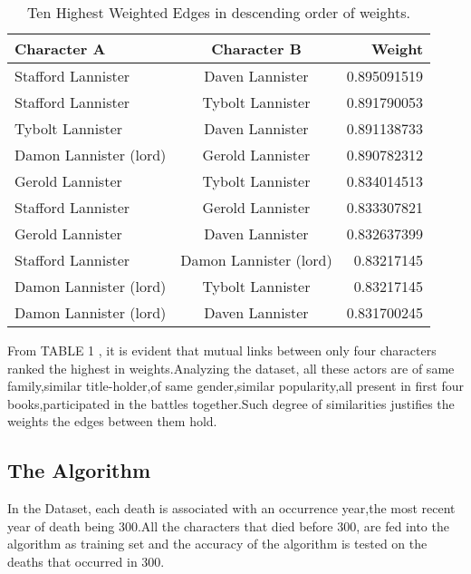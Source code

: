 \documentclass[conference]{IEEEtran}
\begin{document}
\begin{table}[h!]
  \begin{center}
    \caption{Ten Highest Weighted Edges in descending order of weights.}
    \label{tab:table1}
    \begin{tabular}{l|c|r} %
      \textbf{Character A} & \textbf{Character B} & \textbf{Weight}\\
      \hline
      Stafford Lannister & Daven Lannister & 0.895091519\\
      Stafford Lannister & Tybolt Lannister & 0.891790053\\
      Tybolt Lannister & Daven Lannister & 0.891138733\\
      Damon Lannister (lord) & Gerold Lannister & 0.890782312\\
      Gerold Lannister & Tybolt Lannister & 0.834014513\\
      Stafford Lannister & Gerold Lannister & 0.833307821\\
      Gerold Lannister & Daven Lannister & 0.832637399\\
      Stafford Lannister & Damon Lannister (lord) & 0.83217145\\
      Damon Lannister (lord) & Tybolt Lannister & 0.83217145\\
      Damon Lannister (lord) & Daven Lannister & 0.831700245\\
    \end{tabular}
  \end{center}
\end{table}

From TABLE 1 , it is evident that mutual links between only four characters ranked the highest in weights.Analyzing the dataset, all these actors are of same family,similar title-holder,of same gender,similar popularity,all present in first four books,participated in the battles together.Such degree of similarities justifies the weights the edges between them hold.

\subsection{The Algorithm}
In the Dataset, each death is associated with an occurrence year,the most recent year of death being 300.All the characters that died before 300, are fed into the algorithm as training set and the accuracy of the algorithm is tested on the deaths that occurred in 300.
\end{document}
